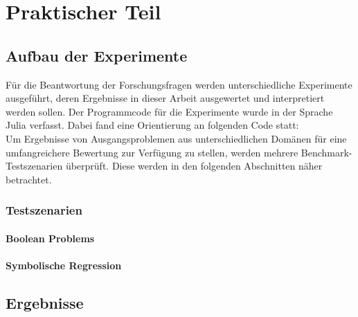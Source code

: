 \chapter{Praktischer Teil}
\label{praktischer Teil}

\section{Aufbau der Experimente}
\label{sec:aufbauExperimente}

Für die Beantwortung der Forschungsfragen werden unterschiedliche Experimente ausgeführt, deren Ergebnisse in dieser Arbeit ausgewertet und interpretiert werden sollen.
Der Programmcode für die Experimente wurde in der Sprache Julia verfasst.
Dabei fand eine Orientierung an folgenden Code statt: \cite{cuihen_cuihencgp_with_crossover_strategies_2024}\\
Um Ergebnisse von Ausgangsproblemen aus unterschiedlichen Domänen für eine umfangreichere Bewertung zur Verfügung zu stellen, werden mehrere Benchmark-Testszenarien überprüft.
Diese werden in den folgenden Abschnitten näher betrachtet.

\subsection{Testszenarien}
\label{subsec:testszenarien}

\subsubsection{Boolean Problems}
\label{subsubsec:booleanProblems}


\subsubsection{Symbolische Regression}
\label{subsubsec:symbolicRegression}

\section{Ergebnisse}
\label{Ergebnisse}

